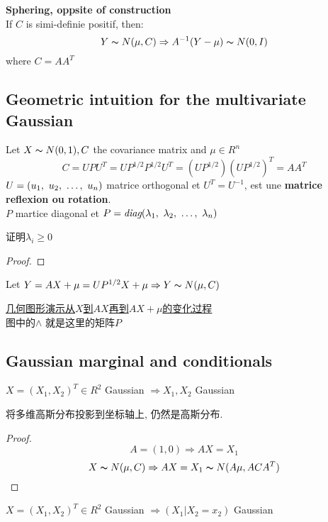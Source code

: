 \documentclass{article}
\begin{document}
\begin{fact}
\textbf{Sphering, oppsite of construction}\\
If $C$ is simi-definie positif, then:
$$Y \thicksim{N}(\mu, C) \Rightarrow A^{-1}(Y - \mu) \thicksim{N}(0,I)$$
where $C = A A^T$
\end{fact}

\subsection{Geometric intuition for the multivariate Gaussian}
Let $X \thicksim{N}(0,1), C $ the covariance matrix and $\mu \in R^n$
$$
C = U P U^T = U P^{1/2} P^{1/2} U^T = (U P^{1/2}) (U P^{1/2})^T =  A A^T
$$
$U = (u_1,~u_2,~\ldots,~u_n)$ matrice orthogonal et $U^T = U^{-1}$, est une \textbf{matrice reflexion ou rotation}.\\
$P$ martice diagonal et $P = \textit{diag}(\lambda_1,~\lambda_2,~\ldots,~\lambda_n)$

证明$\lambda_i \geq 0$
\begin{proof}
\end{proof}

Let $Y = A X + \mu = U P^{1/2} X + \mu \Rightarrow Y \thicksim{N}(\mu, C)$

\href{http://i.imgbox.com/9t3eUww4.png}{几何图形演示从$X$到$AX$再到$AX+\mu$的变化过程}\\
图中的$\wedge$ 就是这里的矩阵$P$

\subsection{Gaussian marginal and conditionals}
\begin{theorem}
$X = (X_1, X_2)^T \in R^2$ Gaussian $\Rightarrow X_1, X_2$ Gaussian
\end{theorem}
将多维高斯分布投影到坐标轴上, 仍然是高斯分布.
\begin{proof}
$$A = (1, 0) \Rightarrow AX = X_1$$
$$X \thicksim{N}(\mu, C) \Rightarrow AX = X_1 \thicksim{N}(A\mu, ACA^T)$$
\end{proof}

\begin{theorem}
$X = (X_1, X_2)^T \in R^2$ Gaussian $\Rightarrow (X_1 | X_2 = x_2)$ Gaussian
\end{theorem}
\end{document}
